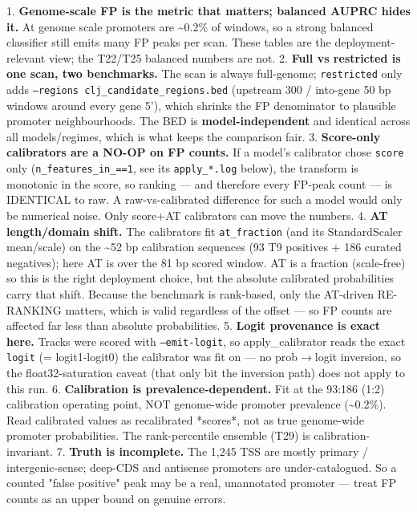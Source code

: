 \documentclass[10pt]{article}
\begin{document}
1. \textbf{Genome-scale FP is the metric that matters; balanced AUPRC hides it.} At genome scale promoters
are \textasciitilde{}0.2\% of windows, so a strong balanced classifier still emits many FP peaks per scan. These
tables are the deployment-relevant view; the T22/T25 balanced numbers are not.
2. \textbf{Full vs restricted is one scan, two benchmarks.} The scan is always full-genome; \texttt{restricted}
only adds \texttt{--regions clj\_candidate\_regions.bed} (upstream 300 / into-gene 50 bp windows around
every gene 5'), which shrinks the FP denominator to plausible promoter neighbourhoods. The BED is
\textbf{model-independent} and identical across all models/regimes, which is what keeps the comparison fair.
3. \textbf{Score-only calibrators are a NO-OP on FP counts.} If a model's calibrator chose \texttt{score} only
(\texttt{n\_features\_in\_==1}, see its \texttt{apply\_*.log} below), the transform is monotonic in the score, so
ranking --- and therefore every FP-peak count --- is IDENTICAL to raw. A raw-vs-calibrated difference
for such a model would only be numerical noise. Only score+AT calibrators can move the numbers.
4. \textbf{AT length/domain shift.} The calibrators fit \texttt{at\_fraction} (and its StandardScaler mean/scale)
on the \textasciitilde{}52 bp calibration sequences (93 T9 positives + 186 curated negatives); here AT is over the
81 bp scored window. AT is a fraction (scale-free) so this is the right deployment choice, but the
absolute calibrated probabilities carry that shift. Because the benchmark is rank-based, only the
AT-driven RE-RANKING matters, which is valid regardless of the offset --- so FP counts are affected
far less than absolute probabilities.
5. \textbf{Logit provenance is exact here.} Tracks were scored with \texttt{--emit-logit}, so apply\_calibrator
reads the exact \texttt{logit} (= logit1-logit0) the calibrator was fit on --- no prob$\to$logit inversion,
so the float32-saturation caveat (that only bit the inversion path) does not apply to this run.
6. \textbf{Calibration is prevalence-dependent.} Fit at the 93:186 (1:2) calibration operating point, NOT
genome-wide promoter prevalence (\textasciitilde{}0.2\%). Read calibrated values as recalibrated *scores*, not as
true genome-wide promoter probabilities. The rank-percentile ensemble (T29) is calibration-invariant.
7. \textbf{Truth is incomplete.} The 1,245 TSS are mostly primary / intergenic-sense; deep-CDS and
antisense promoters are under-catalogued. So a counted "false positive" peak may be a real,
unannotated promoter --- treat FP counts as an upper bound on genuine errors.
\end{document}
